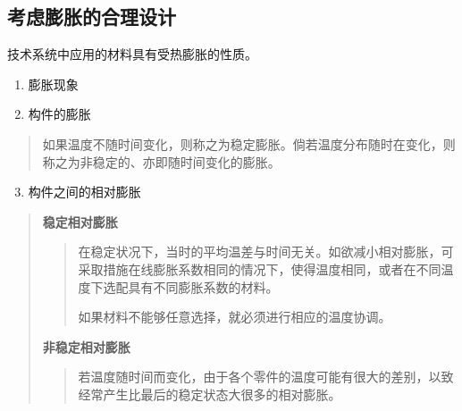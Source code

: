 \documentclass[letterpaper,10pt,english]{sphinxmanual}
\begin{document}
\subsection{考虑膨胀的合理设计}
\label{unit6:id15}
技术系统中应用的材料具有受热膨胀的性质。
\begin{enumerate}
\item {} 
膨胀现象

\item {} 
构件的膨胀

\end{enumerate}
\begin{quote}

如果温度不随时间变化，则称之为稳定膨胀。倘若温度分布随时在变化，则称之为非稳定的、亦即随时间变化的膨胀。
\end{quote}
\begin{enumerate}
\setcounter{enumi}{2}
\item {} 
构件之间的相对膨胀

\end{enumerate}
\begin{quote}

\textbf{稳定相对膨胀}
\begin{quote}

在稳定状况下，当时的平均温差与时间无关。如欲减小相对膨胀，可采取措施在线膨胀系数相同的情况下，使得温度相同，或者在不同温度下选配具有不同膨胀系数的材料。

如果材料不能够任意选择，就必须进行相应的温度协调。
\end{quote}

\textbf{非稳定相对膨胀}
\begin{quote}

若温度随时间而变化，由于各个零件的温度可能有很大的差别，以致经常产生比最后的稳定状态大很多的相对膨胀。
\end{quote}
\end{quote}
\end{document}

